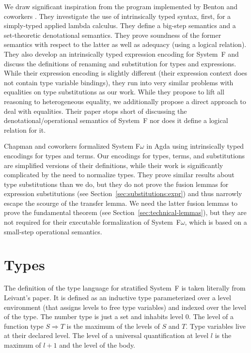 \documentclass[acmsmall,anonymous,review,screen]{acmart}
\begin{document}
We draw significant inspiration from the program implemented by Benton and coworkers
\cite{DBLP:journals/jar/BentonHKM12}. They investigate the use of intrinsically typed
syntax, first, for a simply-typed applied lambda calculus. They define a
big-step semantics and a set-theoretic denotational semantics. They
prove soundness of the former semantics with respect to the latter as
well as adequacy (using a logical relation). They also develop an
intrinsically typed expression encoding for System~F and discuss the
definitions of renaming and substitution for types and expressions.
While their expression encoding is slightly different (their
expression context does not contain type variable bindings), they run
into very similar problems with equalities on type substitutions as
our work. While they propose to lift all reasoning to heterogeneous
equality, we additionally propose a direct approach to deal with
equalities. 
Their paper stops short of discussing the denotational/operational
semantics of System~F nor does it define a logical relation for it.

Chapman and coworkers \cite{DBLP:conf/mpc/ChapmanKNW19} formalized
System F$\omega$ in Agda using intrinsically typed encodings for types
and terms. Our encodings for types, terms, and substitutions are
simplified versions of their definitions, while their work is
significantly complicated by the need to normalize types. They
prove similar results about type substitutions than we do, but they do not
prove the fusion lemmas for expression substitutions (see
Section~\ref{sec:substitutions:expr}) and thus narrowly escape the
scourge of the transfer lemma. We need the latter fusion lemmas to
prove the fundamental theorem (see
Section~\ref{sec:technical-lemmas}), but they are not required for
their executable formalization of System~F$\omega$, which is based on
a small-step operational semantics.


% 
\section{Types}
\label{sec:types}

The definition of the type language for stratified System~F is taken literally from Leivant's
paper. It is defined as an inductive type parameterized over a level
environment (that assigns levels to free type variables) and indexed
over the level of the type. 
\TFType
The number type is just a set and inhabits level $0$.
The level of a function type $S \Rightarrow T$ is the maximum of the
levels of $S$ and $T$.
Type variables live at their declared level.
The level of a universal quantification at
level $l$ is the maximum of $l + 1$ and the level of the body.
\end{document}
